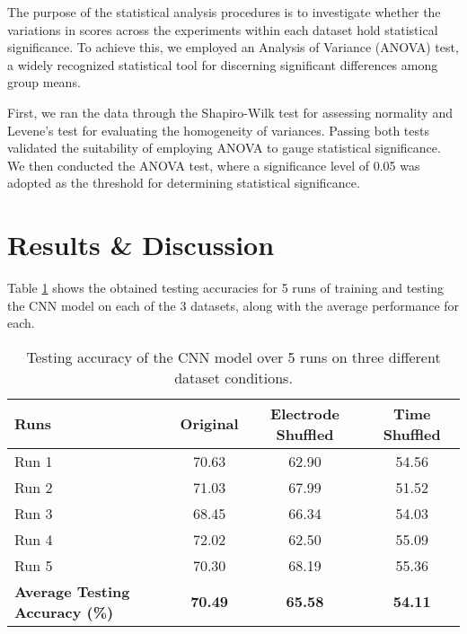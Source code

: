 \documentclass[11pt]{article}
\begin{document}
The purpose of the statistical analysis procedures is to investigate whether the variations in scores across the experiments within each dataset hold statistical significance. To achieve this, we employed an Analysis of Variance (ANOVA) test, a widely recognized statistical tool for discerning significant differences among group means.

First, we ran the data through the Shapiro-Wilk test for assessing normality and Levene's test for evaluating the homogeneity of variances. Passing both tests validated the suitability of employing ANOVA to gauge statistical significance. We then conducted the ANOVA test, where a significance level of 0.05 was adopted as the threshold for determining statistical significance.

\section{Results \& Discussion}



Table \ref{runs} shows the obtained testing accuracies for 5 runs of training and testing the CNN model on each of the 3 datasets, along with the average performance for each.

\begin{table}[H]
\begin{center}
\begin{tabular}{|l|c|c|c|} \hline
{\bf Runs} & {\bf Original} & {\bf Electrode Shuffled} & {\bf Time Shuffled} \\ \hline
Run 1 & 70.63 & 62.90 & 54.56\\
Run 2 & 71.03 & 67.99 & 51.52\\
Run 3 & 68.45 & 66.34 & 54.03\\
Run 4 & 72.02 & 62.50 & 55.09\\
Run 5 & 70.30 & 68.19 & 55.36\\
\textbf{Average Testing Accuracy (\%)} & \textbf{70.49} & \textbf{65.58} & \textbf{54.11}\\ \hline
\end{tabular}
\caption{Testing accuracy of the CNN model over 5 runs on three different dataset conditions.}
\label{runs}
\end{center}
\end{table}
\end{document}
